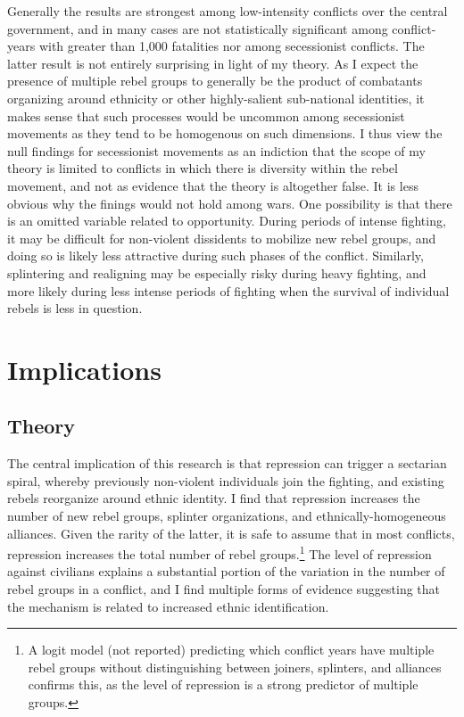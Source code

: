 \documentclass[12pt,]{book}
\let\rmarkdownfootnote\footnote%
\def\footnote{\protect\rmarkdownfootnote}
\theoremstyle{definition}
\theoremstyle{definition}
\theoremstyle{definition}
\theoremstyle{remark}
\begin{document}
Generally the results are strongest among low-intensity conflicts over
the central government, and in many cases are not statistically
significant among conflict-years with greater than 1,000 fatalities nor
among secessionist conflicts. The latter result is not entirely
surprising in light of my theory. As I expect the presence of multiple
rebel groups to generally be the product of combatants organizing around
ethnicity or other highly-salient sub-national identities, it makes
sense that such processes would be uncommon among secessionist movements
as they tend to be homogenous on such dimensions. I thus view the null
findings for secessionist movements as an indiction that the scope of my
theory is limited to conflicts in which there is diversity within the
rebel movement, and not as evidence that the theory is altogether false.
It is less obvious why the finings would not hold among wars. One
possibility is that there is an omitted variable related to opportunity.
During periods of intense fighting, it may be difficult for non-violent
dissidents to mobilize new rebel groups, and doing so is likely less
attractive during such phases of the conflict. Similarly, splintering
and realigning may be especially risky during heavy fighting, and more
likely during less intense periods of fighting when the survival of
individual rebels is less in question.

\hypertarget{implications}{%
\section{Implications}\label{implications}}

\hypertarget{theory-1}{%
\subsection{Theory}\label{theory-1}}

The central implication of this research is that repression can trigger
a sectarian spiral, whereby previously non-violent individuals join the
fighting, and existing rebels reorganize around ethnic identity. I find
that repression increases the number of new rebel groups, splinter
organizations, and ethnically-homogeneous alliances. Given the rarity of
the latter, it is safe to assume that in most conflicts, repression
increases the total number of rebel groups.\footnote{A logit model (not
  reported) predicting which conflict years have multiple rebel groups
  without distinguishing between joiners, splinters, and alliances
  confirms this, as the level of repression is a strong predictor of
  multiple groups.} The level of repression against civilians explains a
substantial portion of the variation in the number of rebel groups in a
conflict, and I find multiple forms of evidence suggesting that the
mechanism is related to increased ethnic identification.
\end{document}
